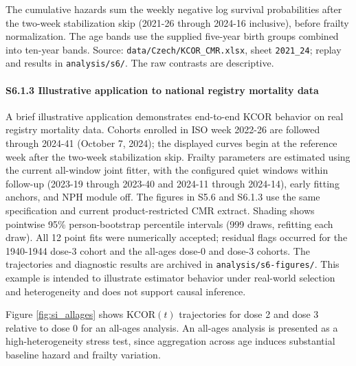 \documentclass[
]{article}
\begin{document}
The cumulative hazards sum the weekly negative log survival probabilities after the two-week stabilization skip (2021-26 through 2024-16 inclusive), before frailty normalization. The age bands use the supplied five-year birth groups combined into ten-year bands. Source: \texttt{data/Czech/KCOR\_CMR.xlsx}, sheet \texttt{2021\_24}; replay and results in \texttt{analysis/s6/}. The raw contrasts are descriptive.

\paragraph{S6.1.3 Illustrative application to national registry mortality data}\label{s6.1.3-illustrative-application-to-national-registry-mortality-data}

A brief illustrative application demonstrates end-to-end KCOR behavior on real registry mortality data. Cohorts enrolled in ISO week 2022-26 are followed through 2024-41 (October 7, 2024); the displayed curves begin at the reference week after the two-week stabilization skip. Frailty parameters are estimated using the current all-window joint fitter, with the configured quiet windows within follow-up (2023-19 through 2023-40 and 2024-11 through 2024-14), early fitting anchors, and NPH module off. The figures in S5.6 and S6.1.3 use the same specification and current product-restricted CMR extract. Shading shows pointwise 95\% person-bootstrap percentile intervals (999 draws, refitting each draw). All 12 point fits were numerically accepted; residual flags occurred for the 1940-1944 dose-3 cohort and the all-ages dose-0 and dose-3 cohorts. The trajectories and diagnostic results are archived in \texttt{analysis/s6-figures/}. This example is intended to illustrate estimator behavior under real-world selection and heterogeneity and does not support causal inference.

Figure \ref{fig:si_allages} shows \(\mathrm{KCOR}(t)\) trajectories for dose 2 and dose 3 relative to dose 0 for an all-ages analysis. An all-ages analysis is presented as a high-heterogeneity stress test, since aggregation across age induces substantial baseline hazard and frailty variation.
\end{document}

